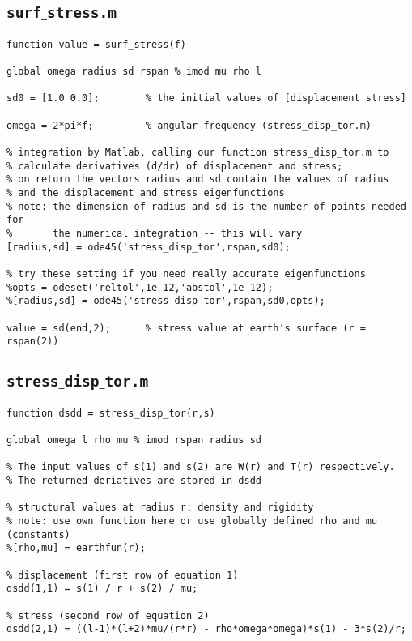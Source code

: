 \documentclass[11pt,titlepage,fleqn]{article}
\begin{document}
\begin{spacing}{1.0}

\subsection{\tt surf$\_$stress.m}
\label{sec:surf}

\small
\begin{verbatim}
function value = surf_stress(f)

global omega radius sd rspan % imod mu rho l

sd0 = [1.0 0.0];        % the initial values of [displacement stress]

omega = 2*pi*f;         % angular frequency (stress_disp_tor.m)

% integration by Matlab, calling our function stress_disp_tor.m to
% calculate derivatives (d/dr) of displacement and stress;
% on return the vectors radius and sd contain the values of radius
% and the displacement and stress eigenfunctions
% note: the dimension of radius and sd is the number of points needed for
%       the numerical integration -- this will vary
[radius,sd] = ode45('stress_disp_tor',rspan,sd0);

% try these setting if you need really accurate eigenfunctions
%opts = odeset('reltol',1e-12,'abstol',1e-12);
%[radius,sd] = ode45('stress_disp_tor',rspan,sd0,opts);

value = sd(end,2);      % stress value at earth's surface (r = rspan(2))
\end{verbatim}
\normalsize


\subsection{\tt stress$\_$disp$\_$tor.m}
\label{sec:stress}

\small
\begin{verbatim}
function dsdd = stress_disp_tor(r,s)

global omega l rho mu % imod rspan radius sd

% The input values of s(1) and s(2) are W(r) and T(r) respectively.
% The returned deriatives are stored in dsdd

% structural values at radius r: density and rigidity
% note: use own function here or use globally defined rho and mu (constants)
%[rho,mu] = earthfun(r);

% displacement (first row of equation 1)
dsdd(1,1) = s(1) / r + s(2) / mu;

% stress (second row of equation 2)
dsdd(2,1) = ((l-1)*(l+2)*mu/(r*r) - rho*omega*omega)*s(1) - 3*s(2)/r;
\end{verbatim}
\normalsize

\end{spacing}
\end{document}
